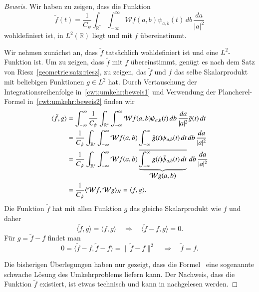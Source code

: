 \begin{proof}[Beweis]
Wir haben zu zeigen, dass die Funktion
\begin{equation}
\tilde{f}(t) = \frac{1}{C_{\psi}}\int_{\mathbb R^*}\int_{-\infty}^\infty
\mathcal{W}f(a,b) \psi_{a,b}(t)
\,db\,\frac{da}{|a|^2}
\end{equation}
wohldefiniert ist, in $L^2(\mathbb R)$ liegt  und mit $f$ übereinstimmt.

Wir nehmen zunächst an, dass $\tilde{f}$ tatsächlich wohldefiniert
ist und eine $L^2$-Funktion ist.
Um zu zeigen, dass $\tilde{f}$ mit $f$ übereinstimmt, genügt es nach
dem Satz von Riesz~\ref{geometrie:satz:riesz}, zu zeigen, das
$\tilde{f}$ und $f$ das selbe Skalarprodukt mit beliebigen Funktionen
$g\in L^2$ hat.
Durch Vertauschung der Integrationsreihenfolge in~\eqref{cwt:umkehr:beweis1}
und Verwendung der Plancherel-Formel in~\eqref{cwt:umkehr:beweis2}
finden wir
\begin{align}
\langle \tilde{f},g\rangle
&=
\int_{-\infty}^\infty
\frac1{C_{\psi}} \int_{\mathbb R^*}\int_{-\infty}^\infty
\mathcal{W}f(a,b)
\psi_{a,b}(t)
\,db\,\frac{da}{|a|^2}
\bar{g}(t)
\,dt
\notag
\\
&=
\frac1{C_{\psi}} \int_{\mathbb R^*}\int_{-\infty}^\infty
\mathcal{W}f(a,b)
\int_{-\infty}^\infty
\bar{g}(t)
\psi_{a,b}(t)
\,dt
\,db\,\frac{da}{|a|^2}
\label{cwt:umkehr:beweis1}
\\
&=
\frac1{C_{\psi}} \int_{\mathbb R^*}\int_{-\infty}^\infty
\mathcal{W}f(a,b)
\underbrace{
\overline{
\int_{-\infty}^\infty
g(t)
\bar{\psi}_{a,b}(t)
\,dt
}}_{\displaystyle\mathcal{W}g(a,b)}
\,db\,\frac{da}{|a|^2}
\notag
\\
&=
\frac{1}{C_{\psi}}
\langle \mathcal{W}f, \mathcal{W}g \rangle_H
=
\langle f, g\rangle.
\label{cwt:umkehr:beweis2}
\end{align}
Die Funktion $\tilde{f}$ hat mit allen Funktion $g$ das gleiche Skalarprodukt
wie $f$ und daher
\[
\langle \tilde{f},g\rangle = \langle f,g\rangle
\quad\Rightarrow\quad
\langle \tilde{f}-f,g\rangle = 0.
\]
Für $g=\tilde{f}-f$ findet man
\[
0
=
\langle \tilde{f}-f,\tilde{f}-f\rangle
=
\|\tilde{f}-f\|^2
\quad\Rightarrow\quad
\tilde{f}=f.
\]

Die bisherigen Überlegungen haben nur gezeigt, dass die
Formel~\label{cwt:umkehr} eine sogenannte schwache Lösung des Umkehrproblems
liefern kann.
Der Nachweis, dass die Funktion $\tilde{f}$ existiert,
ist etwas technisch und kann
in \cite{buch:daubechies} nachgelesen werden.
\end{proof}



